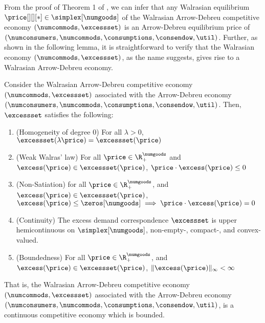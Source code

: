 From the proof of Theorem 1 of \citet{arrow-debreu}, we can infer that any Walrasian equilibrium $\price[][][*] \in \simplex[\numgoods]$ of the  Walrasian Arrow-Debreu competitive economy $(\numcommods, \excessset)$ is an Arrow-Debreu equilibrium price of $(\numconsumers, \numcommods, \consumptions, \consendow, \util)$. Further, as shown in the following lemma, it is straightforward to verify that the Walrasian economy $(\numcommods, \excessset)$, as the name suggests, gives rise to a Walrasian Arrow-Debreu economy. 

\begin{lemma}\label{lemma:ad_economies_are_comp_bounded}
    Consider the Walrasian Arrow-Debreu competitive economy $(\numcommods, \excessset)$ associated with the Arrow-Debreu economy $(\numconsumers, \numcommods, \consumptions, \consendow, \util)$. Then, $\excessset$ satisfies the following:
    \begin{enumerate}
        \item (Homogeneity of degree $0$) For all $\lambda >0$, $\excessset(\lambda \price) = \excessset(\price)$
        \item (Weak Walras' law) For all $\price \in \R^\numgoods_+$ and $\excess(\price) \in \excessset(\price)$,  $\price \cdot \excess(\price) \leq 0$
        \item (Non-Satiation) for all $\price \in \R^\numgoods_+$, and $\excess(\price) \in \excessset(\price)$, $\excess(\price) \leq \zeros[\numgoods] \implies \price \cdot \excess(\price) = 0$
        \item (Continuity) The excess demand correspondence $\excessset$ is upper hemicontinuous on $\simplex[\numgoods]$, non-empty-, compact-, and convex-valued.
        \item (Boundedness) For all $\price \in \R^\numgoods_+$, and $\excess(\price) \in \excessset(\price)$, $\| \excess(\price)\|_\infty < \infty$
    \end{enumerate}
    
    That is, the Walrasian Arrow-Debreu competitive economy $(\numcommods, \excessset)$ associated with the Arrow-Debreu economy $(\numconsumers, \numcommods, \consumptions, \consendow, \util)$, is a continuous competitive economy which is bounded.
    
\end{lemma}

